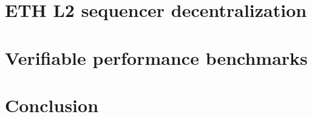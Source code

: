 \documentclass[a4paper, 10pt]{article}
\begin{document}
\section{ETH L2 sequencer decentralization}

\section{Verifiable performance benchmarks}

\section*{Conclusion}
\end{document}
